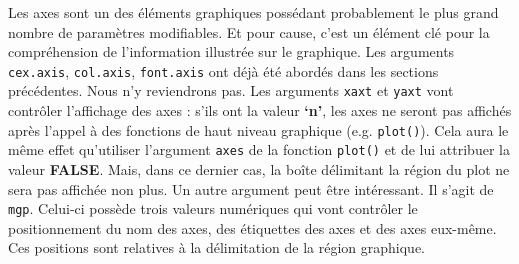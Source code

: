 \documentclass[]{article}
\begin{document}
Les axes sont un des éléments graphiques possédant probablement le plus grand nombre de paramètres modifiables. Et pour cause, c'est un élément clé pour la compréhension de l'information illustrée sur le graphique. Les arguments \texttt{cex.axis}, \texttt{col.axis}, \texttt{font.axis} ont déjà été abordés dans les sections précédentes. Nous n'y reviendrons pas.
Les arguments \texttt{xaxt} et \texttt{yaxt} vont contrôler l'affichage des axes : s'ils ont la valeur \textbf{`n'}, les axes ne seront pas affichés après l'appel à des fonctions de haut niveau graphique (e.g. \texttt{plot()}). Cela aura le même effet qu'utiliser l'argument \texttt{axes} de la fonction \texttt{plot()} et de lui attribuer la valeur \textbf{FALSE}. Mais, dans ce dernier cas, la boîte délimitant la région du plot ne sera pas affichée non plus.
Un autre argument peut être intéressant. Il s'agit de \texttt{mgp}. Celui-ci possède trois valeurs numériques qui vont contrôler le positionnement du nom des axes, des étiquettes des axes et des axes eux-même. Ces positions sont relatives à la délimitation de la région graphique.
\end{document}
